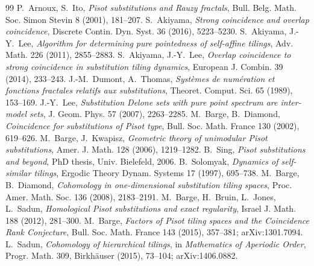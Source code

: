 \documentclass[11pt]{article}
\begin{document}
\begin{thebibliography}{99}
 P.~Arnoux, S.~Ito, \emph{Pisot substitutions and Rauzy
fractals}, Bull. Belg. Math. Soc. Simon Stevin 8 (2001), 181--207.
 S.~Akiyama, \emph{Strong coincidence and overlap
coincidence}, Discrete Contin. Dyn. Syst. 36 (2016), 5223--5230.
 S.~Akiyama, J.-Y.~Lee, \emph{Algorithm for determining
pure pointedness of self-affine tilings}, Adv. Math. 226 (2011),
2855--2883.
 S.~Akiyama, J.-Y.~Lee, \emph{Overlap coincidence to
strong coincidence in substitution tiling dynamics}, European J.
Combin. 39 (2014), 233--243.
 J.-M.~Dumont, A.~Thomas, \emph{Syst\`emes de
num\'eration et fonctions fractales relatifs aux substitutions},
Theoret. Comput. Sci. 65 (1989), 153--169.
 J.-Y.~Lee, \emph{Substitution Delone sets with pure
point spectrum are inter-model sets}, J. Geom. Phys. 57 (2007),
2263--2285.
 M.~Barge, B.~Diamond, \emph{Coincidence for substitutions
of Pisot type}, Bull. Soc. Math. France 130 (2002), 619--626.
 M.~Barge, J.~Kwapisz, \emph{Geometric theory of
unimodular Pisot substitutions}, Amer. J. Math. 128 (2006), 1219--1282.
 B.~Sing, \emph{Pisot substitutions and beyond}, PhD
thesis, Univ. Bielefeld, 2006.
 B.~Solomyak, \emph{Dynamics of self-similar tilings},
Ergodic Theory Dynam. Systems 17 (1997), 695--738.
 M.~Barge, B.~Diamond, \emph{Cohomology in one-dimensional
substitution tiling spaces}, Proc. Amer. Math. Soc. 136 (2008),
2183--2191.
 M.~Barge, H.~Bruin, L.~Jones, L.~Sadun,
\emph{Homological Pisot substitutions and exact regularity}, Israel J.
Math. 188 (2012), 281--300.
 M.~Barge, \emph{Factors of Pisot tiling spaces and the
Coincidence Rank Conjecture}, Bull. Soc. Math. France 143 (2015),
357--381; arXiv:1301.7094.
 L.~Sadun, \emph{Cohomology of hierarchical tilings},
in \emph{Mathematics of Aperiodic Order}, Progr. Math. 309,
Birkh\"auser (2015), 73--104; arXiv:1406.0882.
\end{thebibliography}
\end{document}
